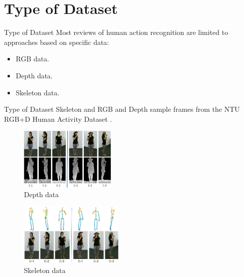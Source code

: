 \section{Type of Dataset}
\begin{frame}{Type of Dataset}
    Most reviews of human action recognition are limited to approaches based on specific data:

    \begin{itemize}
        \item RGB data.
        \item Depth data.
        \item Skeleton data.
    \end{itemize}
\end{frame}

\begin{frame}{Type of Dataset}
    Skeleton and RGB and Depth sample frames from the NTU RGB+D Human Activity Dataset \cite{shahroudy2016ntu}.
    \begin{multicols}{2}
        \begin{figure}[htp]
            \centering
            \includegraphics[height=3cm]{images/v1survey/depth_data_ex.png}
            \caption{Depth data}
            \label{fig:depth_data_ex}
        \end{figure}
        \begin{figure}[htp]
            \centering
            \includegraphics[height=3cm]{images/v1survey/skeleton_data_ex.png}
            \caption{Skeleton data}
            \label{fig:skeleton_data_ex}
        \end{figure}
    \end{multicols}
\end{frame}

